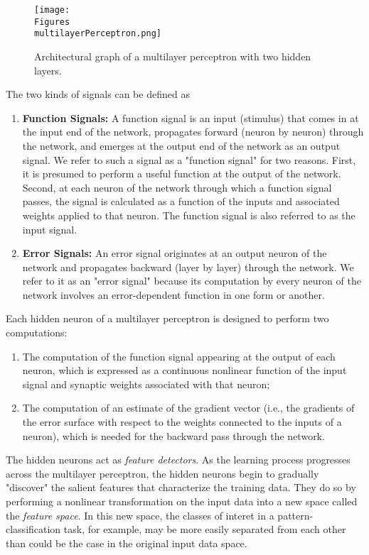 \documentclass[twocolumn]{article}
\begin{document}
 \begin{figure}[H]
	 \center
	 \texttt{[image: \\Figures\\multilayerPerceptron.png]}
	 \caption{Architectural graph of a multilayer perceptron with two hidden layers.}
	 \label{multilayerPerceptron}
 \end{figure}

 The two kinds of signals can be defined as

 \begin{enumerate}
	 \item \textbf{Function Signals:} A function signal is an input (stimulus) that comes in at the input end of the network, propagates forward (neuron by neuron) through the network, and emerges at the output end of the network as an output signal. We refer to such a signal as a "function signal" for two reasons. First, it is presumed to perform a useful function at the output of the network. Second, at each neuron of the network through which a function signal passes, the signal is calculated as a function of the inputs and associated weights applied to that neuron. The function signal is also referred to as the input signal.
	 \item \textbf{Error Signals:} An error signal originates at an output neuron of the network and propagates backward (layer by layer) through the network. We refer to it as an "error signal" because its computation by every neuron of the network involves an error-dependent function in one form or another.
 \end{enumerate}

 Each hidden neuron of a multilayer perceptron is designed to perform two computations:

 \begin{enumerate}
	 \item The computation of the function signal appearing at the output of each neuron, which is expressed as a continuous nonlinear function of the input signal and synaptic weights associated with that neuron;
	 \item The computation of an estimate of the gradient vector (i.e., the gradients of the error surface with respect to the weights connected to the inputs of a neuron), which is needed for the backward pass through the network.
 \end{enumerate}

 The hidden neurons act as \textit{feature detectors}. As the learning process progresses across the multilayer perceptron, the hidden neurons begin to gradually "discover" the salient features that characterize the training data. They do so by performing a nonlinear transformation on the input data into a new space called the \textit{feature space}. In this new space, the classes of interet in a pattern-classification task, for example, may be more easily separated from each other than could be the case in the original input data space.
\end{document}
